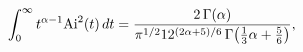 \[\int_{0}^{\infty}t^{\alpha-1}{\mathop{\mathrm{Ai}\/}\nolimits^{2}}\!\left(t%
\right)dt=\frac{2\mathop{\Gamma\/}\nolimits\!\left(\alpha\right)}{\pi^{1/2}12^%
{(2\alpha+5)/6}\mathop{\Gamma\/}\nolimits\!\left(\frac{1}{3}\alpha+\frac{5}{6}%
\right)},\]